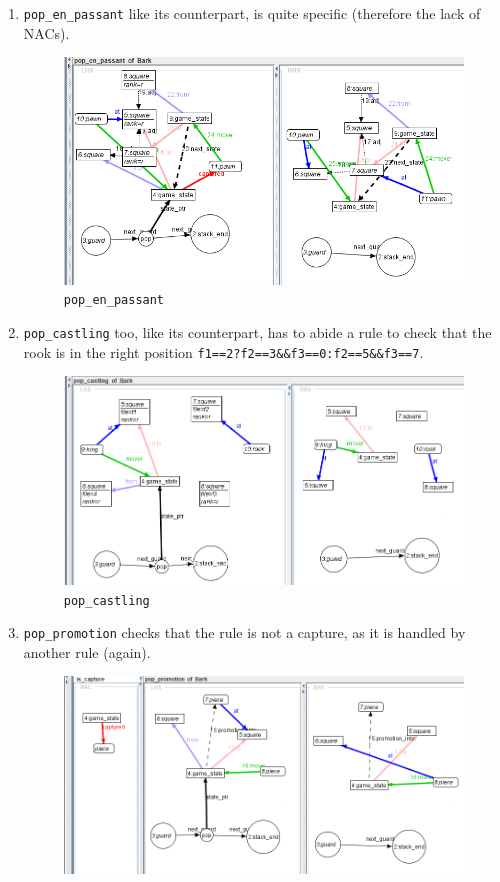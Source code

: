 \documentclass[a4paper, 10pt]{scrartcl}
\begin{document}
\begin{enumerate}
        \item \texttt{pop\_en\_passant} like its counterpart, is quite specific (therefore the lack of NACs).
        \begin{figure}[H]
            \centering
            \includegraphics[width=.8\linewidth]{images/pop_en_passant.png}
            \caption{\texttt{pop\_en\_passant}}
        \end{figure}
        \item \texttt{pop\_castling} too, like its counterpart, has to abide a rule to check that the rook is in the right position \texttt{f1==2?f2==3\&\&f3==0:f2==5\&\&f3==7}.
        \begin{figure}[H]
            \centering
            \includegraphics[width=.8\linewidth]{images/pop_castling.png}
            \caption{\texttt{pop\_castling}}
        \end{figure}
        \item \texttt{pop\_promotion} checks that the rule is not a capture, as it is handled by another rule (again).
        \begin{figure}[H]
            \centering
            \includegraphics[width=.8\linewidth]{images/pop_promotion.png}

\end{figure}
\end{enumerate}
\end{document}
